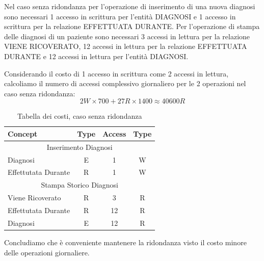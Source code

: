 \documentclass{article}
\begin{document}
Nel caso senza ridondanza per l'operazione di inserimento di una nuova diagnosi sono necessari 1 accesso in scrittura per l'entità DIAGNOSI e 1 accesso in scrittura per la relazione EFFETTUATA DURANTE.
Per l'operazione di stampa delle diagnosi di un paziente sono necessari 3 accessi in lettura per la relazione VIENE RICOVERATO, 12 accessi in lettura per la relazione EFFETTUATA DURANTE e 12 accessi in lettura per l'entità DIAGNOSI.

Considerando il costo di 1 accesso in scrittura come 2 accessi in lettura, calcoliamo il numero di accessi complessivo giornaliero per le 2 operazioni nel caso senza ridondanza:
\begin{equation}
	2W \times 700 + 27R \times 1400 \approx	40600R
\end{equation}

\begin{table}[H]
	\label{table:4}
	\centering
	\begin{tabular}{|l|c|c|c|}
		\hline
		\textbf{Concept}    & \textbf{Type} & \textbf{Access} & \textbf{Type} \\ \hline
		\multicolumn{4}{|c|}{Inserimento Diagnosi}                            \\ \hline
		Diagnosi            & E             & 1               & W             \\ \hline
		Effettutata Durante & R             & 1               & W             \\ \hline
		\multicolumn{4}{|c|}{Stampa Storico Diagnosi}                         \\ \hline
		Viene Ricoverato    & R             & 3               & R             \\ \hline
		Effettutata Durante & R             & 12              & R             \\ \hline
		Diagnosi            & E             & 12              & R             \\ \hline
	\end{tabular}
	\caption{Tabella dei costi, caso senza ridondanza}
\end{table}

Concludiamo che è conveniente mantenere la ridondanza visto il costo minore delle operazioni giornaliere.
\end{document}

